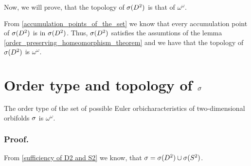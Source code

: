 %
%

Now, we will prove, that the topology of ${{\sigma}(D^2)}$ is that of $\omega^\omega$.

From \ref{accumulation_points_of_the_set} we know that every accumulation point 
of ${{\sigma}(D^2)}$ is in ${{\sigma}(D^2)}$. 
Thus, ${{\sigma}(D^2)}$ satisfies the assumtions of the lemma \ref{order_preserving_homeomorphism_theorem} 
and 
we have that 
the topology of ${{\sigma}(D^2)}$ is $\omega^\omega$. 













\section{Order type and topology of ${\sigma}$}
\begin{theorem}
The order type of the set of possible Euler orbicharacteristics of two-dimensional orbifolds 
${\sigma}$ is $\omega^\omega$. 
\end{theorem}
\subsubsection{Proof.}
From \ref{sufficiency of D2 and S2}
we know, that ${\sigma} = {{\sigma}(D^2)} \cup {{\sigma}(S^2)}$.

